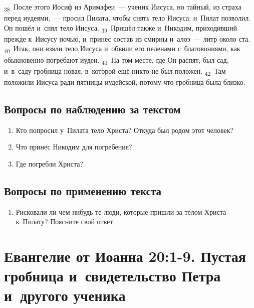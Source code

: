 \documentclass[a4paper,12pt]{article}
\begin{document}
\textsubscript{38}~После этого Иосиф из Аримафеи~--- ученик Иисуса, но тайный, из страха перед иудеями,~--- просил Пилата, чтобы снять тело Иисуса; и~Пилат позволил. Он пошёл и~снял тело Иисуса. \textsubscript{39}~Пришёл также и~Никодим, приходивший прежде к~Иисусу ночью, и~принес состав из смирны и~алоэ~--- литр около ста. \textsubscript{40}~Итак, они взяли тело Иисуса и~обвили его пеленами с~благовониями, как обыкновенно погребают иудеи. \textsubscript{41}~На том месте, где Он распят, был сад, и~в~саду гробница новая, в~которой ещё никто не был положен. \textsubscript{42}~Там положили Иисуса ради пятницы иудейской, потому что гробница была близко.

\subsection*{Вопросы по наблюдению за текстом}
\begin{enumerate}
    \item Кто попросил у~Пилата тело Христа? Откуда был родом этот человек? 
    
    \myline
    
    \myline
    \item Что принес Никодим для погребения? 
    
    \myline
    
    \myline
    \item Где погребли Христа? 
    
    \myline
    
    \myline
\end{enumerate}

\subsection*{Вопросы по применению текста} 
\begin{enumerate}
    \item Рисковали ли чем-нибудь те люди, которые пришли за телом Христа к~Пилату? Поясните свой ответ. 
    
    \myline
    
    \myline
\end{enumerate}



\section{Евангелие от Иоанна 20:1-9. Пустая гробница и~свидетельство Петра и~другого ученика}
\end{document}
